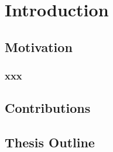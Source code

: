 \chapter{Introduction}\label{ch:introduction}

\section{Motivation}

\subsection{xxx}




\section{Contributions}




\section{Thesis Outline}


